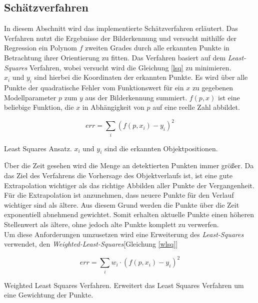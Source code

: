 \subsection{Schätzverfahren}
\label{sec_curveFit}
In diesem Abschnitt wird das implementierte Schätzverfahren erläutert. Das Verfahren nutzt die Ergebnisse der Bilderkennung und versucht mithilfe der Regression ein Polynom $f$ zweiten Grades durch alle erkannten Punkte in Betrachtung ihrer Orientierung zu fitten.
Das Verfahren basiert auf dem \textit{Least-Squares} Verfahren\cite{simon2006optimal}, wobei versucht wird die Gleichung \ref{lsq} zu minimieren.\\
$x_i$ und $y_i$ sind hierbei die Koordinaten der erkannten Punkte. Es wird über alle Punkte der quadratische Fehler vom Funktionswert für ein $x$ zu gegebenen Modellparameter $p$ zum $y$ aus der Bilderkennung summiert. $f(p,x)$ ist eine beliebige Funktion, die $x$ in Abhängigkeit von $p$ auf eine reelle Zahl abbildet.\\
\begin{ownequation}[H]
\begin{equation}
err = \sum_{i}(f(p,x_i)-y_i)^2
\end{equation}
\caption[Least Squares Ansatz]{Least Squares Ansatz. $x_i$ und $y_i$ sind die erkannten Objektpositionen.}
\label{lsq}
\end{ownequation}
Über die Zeit gesehen wird die Menge an detektierten Punkten immer größer. Da das Ziel des Verfahrens die Vorhersage des Objektverlaufs ist, ist eine gute Extrapolation wichtiger als das richtige Abbilden aller Punkte der Vergangenheit. Für die Extrapolation ist anzunehmen, dass neuere Punkte für den Verlauf wichtiger sind als ältere. Aus diesem Grund werden die Punkte über die Zeit exponentiell abnehmend gewichtet. Somit erhalten aktuelle Punkte einen höheren Stellenwert als ältere, ohne jedoch alte Punkte komplett zu verwerfen.\\
Um diese Anforderungen umzusetzen wird eine Erweiterung des \textit{Least-Squares} verwendet, den \textit{Weighted-Least-Squares}[Gleichung \ref{wlsq}]\\
\begin{ownequation}[H]
\begin{equation}
err = \sum_{i}w_i \cdot (f(p,x_i)-y_i)^2
\end{equation}
\caption[Weighted Least Squares Verfahren]{Weighted Least Squares Verfahren. Erweitert das Least Squares Verfahren um eine Gewichtung der Punkte.}
\label{wlsq}
\end{ownequation}

